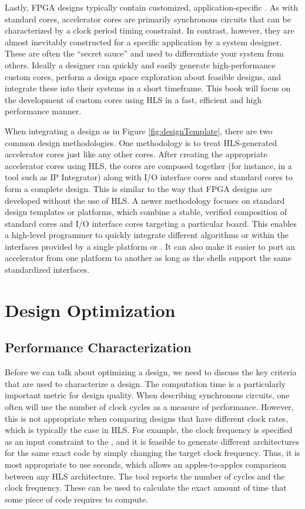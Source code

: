 Lastly, FPGA designs typically contain customized, application-specific .  As with standard cores, accelerator cores are primarily synchronous circuits that can be characterized by a clock period timing constraint.  In contrast, however, they are almost inevitably constructed for a specific application by a system designer.  These are often the ``secret sauce'' and used to differentiate your system from others. Ideally a designer can quickly and easily generate high-performance custom cores, perform a design space exploration about feasible designs, and integrate these into their systems in a short timeframe. This book will focus on the development of custom cores using HLS in a fast, efficient and high performance manner.

When integrating a design as in Figure \ref{fig:designTemplate}, there are two common design methodologies.  One methodology is to treat HLS-generated accelerator cores just like any other cores.  After creating the appropriate accelerator cores using HLS, the cores are composed together (for instance, in a tool such as \vivado IP Integrator) along with I/O interface cores and standard cores to form a complete design.  This  is similar to the way that FPGA designs are developed without the use of HLS.  A newer methodology focuses on standard design templates or platforms, which combine a stable, verified composition of standard cores and I/O interface cores targeting a particular board. This  enables a high-level programmer to quickly integrate different algorithms or  within the interfaces provided by a single platform or .  It can also make it easier to port an accelerator from one platform to another as long as the shells support the same standardized interfaces.


\section{Design Optimization}
\label{sec:designOptimization}

\subsection{Performance Characterization}
\label{sec:designCharacterization}
Before we can talk about optimizing a design, we need to discuss the key criteria that are used to characterize a design.   The computation time is a particularly important metric for design quality.  When describing synchronous circuits, one often will use the number of clock cycles as a measure of performance.  However, this is not appropriate when comparing designs that have different clock rates, which is typically the case in HLS. For example, the clock frequency is specified as an input constraint to the \VHLS, and it is feasible to generate different architectures for the same exact code by simply changing the target clock frequency.  Thus, it is most appropriate to use seconds, which allows an apples-to-apples comparison between any HLS architecture. The \VHLS tool reports the number of cycles and the clock frequency. These can be used to calculate the exact amount of time that some piece of code requires to compute.

